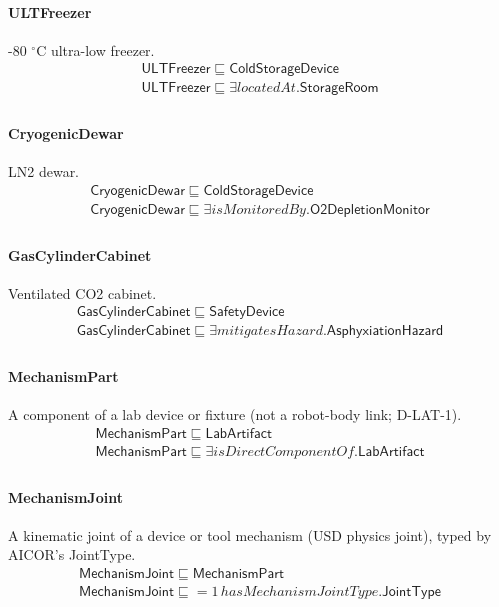 \documentclass[10pt]{article}
\begin{document}
\paragraph{ULTFreezer} -80 $^\circ$C ultra-low freezer.
\[\begin{array}{l}
\mathsf{ULTFreezer} \sqsubseteq  \mathsf{ColdStorageDevice} \\
\mathsf{ULTFreezer} \sqsubseteq  \exists \mathit{locatedAt}.\mathsf{StorageRoom} \\
\end{array}\]
\paragraph{CryogenicDewar} LN2 dewar.
\[\begin{array}{l}
\mathsf{CryogenicDewar} \sqsubseteq  \mathsf{ColdStorageDevice} \\
\mathsf{CryogenicDewar} \sqsubseteq  \exists \mathit{isMonitoredBy}.\mathsf{O2DepletionMonitor} \\
\end{array}\]
\paragraph{GasCylinderCabinet} Ventilated CO2 cabinet.
\[\begin{array}{l}
\mathsf{GasCylinderCabinet} \sqsubseteq  \mathsf{SafetyDevice} \\
\mathsf{GasCylinderCabinet} \sqsubseteq  \exists \mathit{mitigatesHazard}.\mathsf{AsphyxiationHazard} \\
\end{array}\]
\paragraph{MechanismPart} A component of a lab device or fixture (not a robot-body link; D-LAT-1).
\[\begin{array}{l}
\mathsf{MechanismPart} \sqsubseteq  \mathsf{LabArtifact} \\
\mathsf{MechanismPart} \sqsubseteq  \exists \mathit{isDirectComponentOf}.\mathsf{LabArtifact} \\
\end{array}\]
\paragraph{MechanismJoint} A kinematic joint of a device or tool mechanism (USD physics joint), typed by AICOR's JointType.
\[\begin{array}{l}
\mathsf{MechanismJoint} \sqsubseteq  \mathsf{MechanismPart} \\
\mathsf{MechanismJoint} \sqsubseteq  {=}1\, \mathit{hasMechanismJointType}.\mathsf{JointType} \\
\end{array}\]
\end{document}
